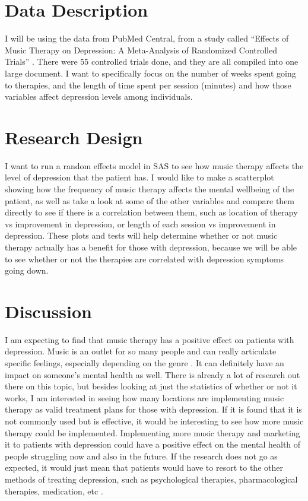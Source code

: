 \documentclass[12pt]{article}
\begin{document}
 \section{Data Description}
 \label{sec:data}

 I will be using the data from PubMed Central, from a study called “Effects of Music Therapy on Depression: A Meta-Analysis of Randomized Controlled Trials” \citet{PLOS}. There were 55 controlled trials done, and they are all compiled into one large document. I want to specifically focus on the number of weeks spent going to therapies, and the length of time spent per session (minutes) and how those variables affect depression levels among individuals.


 \section{Research Design}
 \label{sec:research}

 I want to run a random effects model in SAS to see how music therapy affects the level of depression that the patient has. I would like to make a scatterplot showing how the frequency of music therapy affects the mental wellbeing of the patient, as well as take a look at some of the other variables and compare them directly to see if there is a correlation between them, such as location of therapy vs improvement in depression, or length of each session vs improvement in depression. These plots and tests will help determine whether or not music therapy actually has a benefit for those with depression, because we will be able to see whether or not the therapies are correlated with depression symptoms going down.

 \section{Discussion}
 \label{sec:disc}

 I am expecting to find that music therapy has a positive effect on patients with depression. Music is an outlet for so many people and can really articulate specific feelings, especially depending on the genre \citet{Frontiers}. It can definitely have an impact on someone’s mental health as well. There is already a lot of research out there on this topic, but besides looking at just the statistics of whether or not it works, I am interested in seeing how many locations are implementing music therapy as valid treatment plans for those with depression. If it is found that it is not commonly used but is effective, it would be interesting to see how more music therapy could be implemented. Implementing more music therapy and marketing it to patients with depression could have a positive effect on the mental health of people struggling now and also in the future. If the research does not go as expected, it would just mean that patients would have to resort to the other methods of treating depression, such as psychological therapies, pharmacological therapies, medication, etc \citet{Cochrane}.
\end{document}
